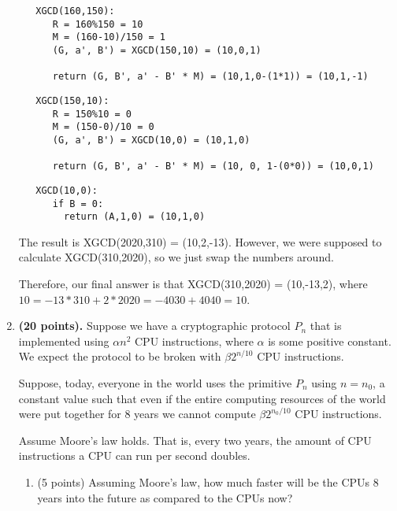 \documentclass[11pt]{article}
\begin{document}
\begin{enumerate}
{   \begin{verbatim}
   XGCD(160,150):
      R = 160%150 = 10
      M = (160-10)/150 = 1
      (G, a', B') = XGCD(150,10) = (10,0,1)

      return (G, B', a' - B' * M) = (10,1,0-(1*1)) = (10,1,-1)
   \end{verbatim}

   \begin{verbatim}
   XGCD(150,10):
      R = 150%10 = 0
      M = (150-0)/10 = 0
      (G, a', B') = XGCD(10,0) = (10,1,0)

      return (G, B', a' - B' * M) = (10, 0, 1-(0*0)) = (10,0,1)
   \end{verbatim}

   \begin{verbatim}
   XGCD(10,0):
      if B = 0:
        return (A,1,0) = (10,1,0)
   \end{verbatim}

   The result is XGCD(2020,310) = (10,2,-13). However, we were supposed to calculate XGCD(310,2020), so we just swap the numbers around.

   Therefore, our final answer is that XGCD(310,2020) = (10,-13,2), where $10=-13*310 + 2*2020 = -4030 + 4040 = 10$.

  }
   \newpage
  

  


  
 \item    {\bfseries  (20 points).}  Suppose we have a cryptographic protocol $P_n$ that is implemented using $\alpha n^2$ CPU instructions, where $\alpha$ is some positive constant.  
  We expect the protocol to be broken with $\beta 2^{n/10}$ CPU instructions. 
  
  Suppose, today, everyone in the world uses the primitive $P_n$ using $n=n_0$, a constant value such that even if the entire computing resources of the world were put together for 8 years we cannot compute $\beta 2^{n_0/10}$ CPU instructions. 
  
  Assume Moore's law holds. 
  That is, every two years, the amount of CPU instructions a CPU can run per second doubles. 
  
  \begin{enumerate}
  \item (5 points) Assuming Moore's law, how much faster will be the CPUs 8 years into the future as compared to the CPUs now?
  {\bfseries 

}
\end{enumerate}
\end{enumerate}
\end{document}
